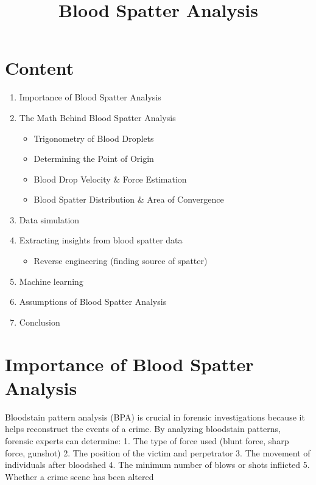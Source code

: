 \documentclass[11pt]{article}
\title{Blood Spatter Analysis}
\providecommand{\tightlist}{%
      \setlength{\itemsep}{0pt}\setlength{\parskip}{0pt}}
\begin{document}
    
    \maketitle
    
    

    
  
\section{Content}\label{content}

\begin{enumerate}
\def\labelenumi{\arabic{enumi}.}
\tightlist
\item
  Importance of Blood Spatter Analysis
\item
  The Math Behind Blood Spatter Analysis

  \begin{itemize}
  \tightlist
  \item
    Trigonometry of Blood Droplets
  \item
    Determining the Point of Origin
  \item
    Blood Drop Velocity \& Force Estimation
  \item
    Blood Spatter Distribution \& Area of Convergence
  \end{itemize}
\item
  Data simulation
\item
  Extracting insights from blood spatter data

  \begin{itemize}
  \tightlist
  \item
    Reverse engineering (finding source of spatter)
  \end{itemize}
\item
  Machine learning
\item
  Assumptions of Blood Spatter Analysis
\item
  Conclusion
\end{enumerate}

\section{Importance of Blood Spatter
Analysis}\label{importance-of-blood-spatter-analysis}

Bloodstain pattern analysis (BPA) is crucial in forensic investigations
because it helps reconstruct the events of a crime. By analyzing
bloodstain patterns, forensic experts can determine: 1. The type of
force used (blunt force, sharp force, gunshot) 2. The position of the
victim and perpetrator 3. The movement of individuals after bloodshed 4.
The minimum number of blows or shots inflicted 5. Whether a crime scene
has been altered
\end{document}

